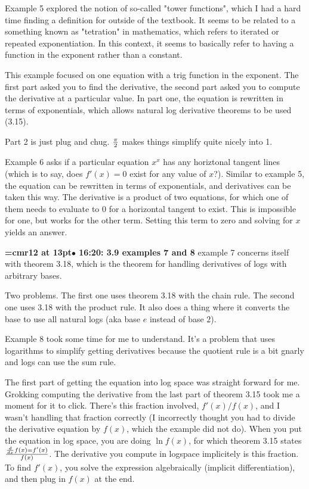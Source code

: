 Example 5 explored the notion of so-called "tower functions", which I had a hard time finding a definition for outside of the textbook. It seems to be related to a something known as "tetration" in mathematics, which refers to iterated or repeated exponentiation. In this context, it seems to basically refer to having a function in the exponent rather than a constant.
\par

This example focused on one equation with a trig function in the exponent. The first part asked you to find the derivative, the second part asked you to compute the derivative at a particular value. In part one, the equation is rewritten in terms of exponentials, which allows natural log derivative theorems to be used (3.15).
\par

Part 2 is just plug and chug. $\pi \over 2$ makes things simplify quite nicely into 1.
\par

Example 6 asks if a particular equation $x^x$ has any horiztonal tangent lines (which is to say, does $f'(x) = 0$ exist for any value of $x$?). Similar to example 5, the equation can be rewritten in terms of exponentials, and derivatives can be taken this way. The derivative is a product of two equations, for which one of them needs to evaluate to 0 for a horizontal tangent to exist. This is impossible for one, but works for the other term. Setting this term to zero and solving for $x$ yields an answer.
\par

{\smallskip\noindent\bf\font\titlefont=cmr12 at 13pt\titlefont $\bullet$ 16:20: 3.9 examples 7 and 8}\smallskip
example 7 concerns itself with theorem 3.18, which is the theorem for handling derivatives of logs with arbitrary bases.
\par

Two problems. The first one uses theorem 3.18 with the chain rule. The second one uses 3.18 with the product rule. It also does a thing where it converts the base to use all natural logs (aka base $e$ instead of base $2$).
\par

Example 8 took some time for me to understand. It's a problem that uses logarithms to simplify getting derivatives because the quotient rule is a bit gnarly and logs can use the sum rule.
\par

The first part of getting the equation into log space was straight forward for me. Grokking computing the derivative  from the last part of theorem 3.15 took me a moment for it to click. There's this fraction involved, $f'(x)/f(x)$, and I wasn't handling that fraction correctly (I incorrectly thought you had to divide the derivative equation by $f(x)$, which the example did not do). When you put the equation in log space, you are doing $\ln f(x)$, for which theorem 3.15 states ${d \over dx} f(x) = f'(x) \over f(x)$. The derivative you compute in logspace implicitely is this fraction. To find $f'(x)$, you solve the expression algebraically (implicit differentiation), and then plug in $f(x)$ at the end.
\par


